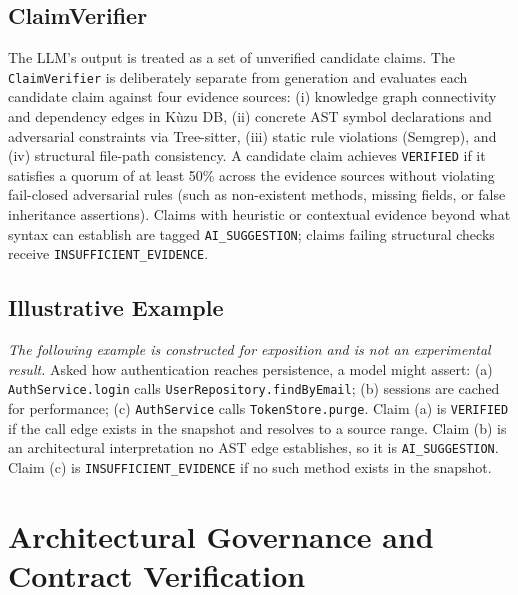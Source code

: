 \documentclass[runningheads]{llncs}
\begin{document}
\subsection{ClaimVerifier}
The LLM's output is treated as a set of unverified candidate claims. The \texttt{ClaimVerifier} is deliberately separate from generation and evaluates each candidate claim against four evidence sources: (i) knowledge graph connectivity and dependency edges in Kùzu DB, (ii) concrete AST symbol declarations and adversarial constraints via Tree-sitter, (iii) static rule violations (Semgrep), and (iv) structural file-path consistency. A candidate claim achieves \texttt{VERIFIED} if it satisfies a quorum of at least 50\% across the evidence sources without violating fail-closed adversarial rules (such as non-existent methods, missing fields, or false inheritance assertions). Claims with heuristic or contextual evidence beyond what syntax can establish are tagged \texttt{AI\_SUGGESTION}; claims failing structural checks receive \texttt{INSUFFICIENT\_EVIDENCE}.

\subsection{Illustrative Example}
\textit{The following example is constructed for exposition and is not an experimental result.} Asked how authentication reaches persistence, a model might assert: (a) \texttt{AuthService.login} calls \texttt{UserRepository.findByEmail}; (b) sessions are cached for performance; (c) \texttt{AuthService} calls \texttt{TokenStore.purge}. Claim (a) is \texttt{VERIFIED} if the call edge exists in the snapshot and resolves to a source range. Claim (b) is an architectural interpretation no AST edge establishes, so it is \texttt{AI\_SUGGESTION}. Claim (c) is \texttt{INSUFFICIENT\_EVIDENCE} if no such method exists in the snapshot.

\section{Architectural Governance and Contract Verification}
\end{document}
